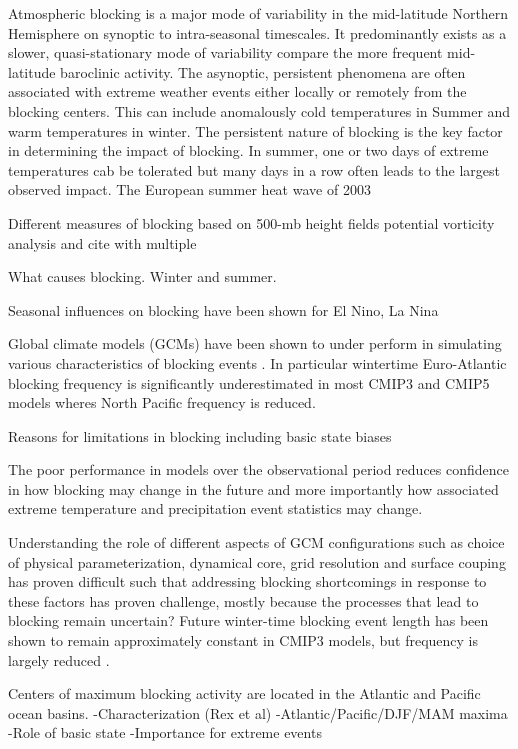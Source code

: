 \documentclass[12pt,varwidth]{article}
\begin{document}
Atmospheric blocking is a major mode of variability in the mid-latitude Northern Hemisphere \citep{Rex50} on synoptic to intra-seasonal timescales. It predominantly exists as a slower, quasi-stationary mode of variability compare the more frequent mid-latitude baroclinic activity. The asynoptic, persistent phenomena are often associated with extreme weather events either locally or remotely from the blocking centers. This can include anomalously cold temperatures in Summer and warm temperatures in winter. The persistent nature of blocking is the key factor in determining the impact of blocking. In summer, one or two days of extreme temperatures cab be tolerated but many days in a row often leads to the largest observed impact. The European summer heat wave of 2003

Different measures of blocking based on 500-mb height fields potential vorticity analysis and cite \citep{Barnes12} with multiple  

What causes blocking. Winter and summer.

Seasonal influences on blocking have been shown for El Nino, La Nina

Global climate models (GCMs) have been shown to under perform in simulating various characteristics of blocking events \citep{Mosato13}. In particular wintertime Euro-Atlantic blocking frequency is significantly underestimated in most CMIP3 and CMIP5 \citep{Dunn13} models wheres North Pacific frequency is reduced.

Reasons for limitations in blocking including basic state biases \citep{Scaife10}

The poor performance in models over the observational period reduces confidence in how blocking may change in the future and more importantly how associated extreme temperature and precipitation event statistics may change. 

Understanding the role of different aspects of GCM configurations such as choice of physical parameterization, dynamical core, grid resolution and surface couping has proven difficult such that addressing blocking shortcomings in response to these factors has proven challenge, mostly because the processes that lead to blocking remain uncertain? Future winter-time blocking event length has been shown to remain approximately constant in CMIP3 models, but frequency is largely reduced \citep{Barnes12}.

Centers of maximum blocking activity are located in the Atlantic and Pacific ocean basins.
-Characterization (Rex et al)
-Atlantic/Pacific/DJF/MAM maxima
-Role of basic state
-Importance for extreme events
\end{document}
